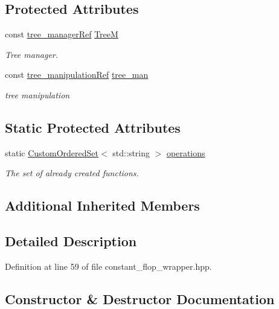 \subsection*{Protected Attributes}
\begin{DoxyCompactItemize}
\item 
const \hyperlink{tree__manager_8hpp_a96ff150c071ce11a9a7a1e40590f205e}{tree\+\_\+manager\+Ref} \hyperlink{classconstant__flop__wrapper_a9da1eb4ed1c4da9d815544ed38c0e872}{TreeM}
\begin{DoxyCompactList}\small\item\em Tree manager. \end{DoxyCompactList}\item 
const \hyperlink{tree__manipulation_8hpp_a1a9460e3a2f9fc6a96cfd2f24cc9b2a5}{tree\+\_\+manipulation\+Ref} \hyperlink{classconstant__flop__wrapper_a41c86dc5e14de902afddb548d5f2e0d8}{tree\+\_\+man}
\begin{DoxyCompactList}\small\item\em tree manipulation \end{DoxyCompactList}\end{DoxyCompactItemize}
\subsection*{Static Protected Attributes}
\begin{DoxyCompactItemize}
\item 
static \hyperlink{classCustomOrderedSet}{Custom\+Ordered\+Set}$<$ std\+::string $>$ \hyperlink{classconstant__flop__wrapper_ac063314f49be7c593e697c82116faee0}{operations}
\begin{DoxyCompactList}\small\item\em The set of already created functions. \end{DoxyCompactList}\end{DoxyCompactItemize}
\subsection*{Additional Inherited Members}


\subsection{Detailed Description}


Definition at line 59 of file constant\+\_\+flop\+\_\+wrapper.\+hpp.



\subsection{Constructor \& Destructor Documentation}
\mbox{\label{classconstant__flop__wrapper_af5e724c3d57be6463c65ebe0d536d558}} 
